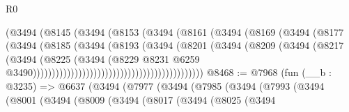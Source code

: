 \begin{lexlean}{R0}
\begin{coremodule}
                                              (@3494
                                                (@8145
                                                  (@3494
                                                    (@8153
                                                      (@3494
                                                        (@8161
                                                          (@3494
                                                            (@8169
                                                              (@3494
                                                                (@8177
                                                                  (@3494
                                                                    (@8185
                                                                      (@3494
                                                                        (@8193
                                                                          (@3494
                                                                            (@8201
                                                                              (@3494
                                                                                (@8209
                                                                                  (@3494
                                                                                    (@8217
                                                                                      (@3494
                                                                                        (@8225
                                                                                          (@3494
                                                                                            (@8229
                                                                                              @8231
                                                                                              @6259
                                                                                              @3490)))))))))))))))))))))))))))))))))))))))))))))
@8468 := @7968
    (fun (__b : @3235) =>
    @6637
      (@3494
        (@7977
          (@3494
            (@7985
              (@3494
                (@7993
                  (@3494
                    (@8001
                      (@3494
                        (@8009
                          (@3494
                            (@8017
                              (@3494
                                (@8025
                                  (@3494

\end{coremodule}
\end{lexlean}
